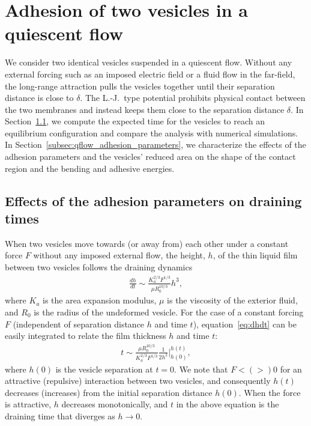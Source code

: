 \documentclass[prf,superscriptaddress,showkeys]{revtex4-1}
\begin{document}


\section{Adhesion of two vesicles in a quiescent flow} 
\label{sec:qflow} 
We consider two identical vesicles suspended in a quiescent flow.
Without any external forcing such as an imposed electric field or a
fluid flow in the far-field, the long-range attraction pulls the
vesicles together until their separation distance is close to $\delta$.
The L.-J.~type potential prohibits physical contact between the two
membranes and instead keeps them close to the separation distance
$\delta$.  In Section~\ref{subsec:qflow_draining_times}, we compute the
expected time for the vesicles to reach an equilibrium configuration and
compare the analysis with numerical simulations.  In
Section~\ref{subsec:qflow_adhesion_parameters}, we characterize the
effects of the adhesion parameters and the vesicles' reduced area on the
shape of the contact region and the bending and adhesive energies.

\subsection{Effects of the adhesion parameters on draining times}
\label{subsec:qflow_draining_times}
When two vesicles move towards (or away from) each other under a
constant force $F$ without any imposed external flow, the height, $h$,
of the thin liquid film between two vesicles follows the draining
dynamics~\cite{RamachandranLeal2010_PoF}
\begin{align}
  \label{eq:dhdt}
  \frac{d h}{dt} \sim \frac{K_a^{2/3} F^{1/3}}{\mu R_0^{10/3}} h^3,
\end{align}
where $K_a$ is the area expansion modulus, $\mu$ is the viscosity of the
exterior fluid, and $R_0$ is the radius of the undeformed vesicle.  For
the case of a constant forcing $F$ (independent of separation distance
$h$ and time $t$), equation~\eqref{eq:dhdt} can be easily integrated to
relate the film thickness $h$ and time $t$:
\begin{align*}
  t \sim \frac{\mu R_0^{10/3}}{K_a^{2/3} F^{1/3}}
    \frac{1}{2 h^2} \bigg|^{h(t)}_{h(0)},
\end{align*}
where $h(0)$ is the vesicle separation at $t=0$.  We note that $F< (>)
0$ for an attractive  (repulsive) interaction between two vesicles,  and
consequently $h(t)$ decreases (increases) from  the initial separation
distance $h(0)$.  When the force is attractive, $h$ decreases
monotonically, and $t$ in the above equation is the draining time that
diverges as $h\rightarrow 0$.
\end{document}
